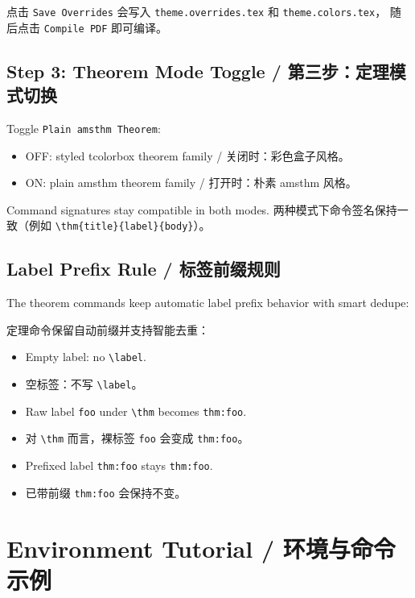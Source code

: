 \documentclass[oneside]{book}
\begin{document}
点击 \texttt{Save Overrides} 会写入
\texttt{theme.overrides.tex} 和 \texttt{theme.colors.tex}，
随后点击 \texttt{Compile PDF} 即可编译。

\section{Step 3: Theorem Mode Toggle / 第三步：定理模式切换}

Toggle \texttt{Plain amsthm Theorem}:
\begin{itemize}
    \item OFF: styled tcolorbox theorem family / 关闭时：彩色盒子风格。
    \item ON: plain amsthm theorem family / 打开时：朴素 amsthm 风格。
\end{itemize}

Command signatures stay compatible in both modes.
两种模式下命令签名保持一致（例如 \texttt{\textbackslash thm\{title\}\{label\}\{body\}}）。

\section{Label Prefix Rule / 标签前缀规则}

The theorem commands keep automatic label prefix behavior with smart dedupe:

定理命令保留自动前缀并支持智能去重：
\begin{itemize}
    \item Empty label: no \texttt{\textbackslash label}.
    \item 空标签：不写 \texttt{\textbackslash label}。
    \item Raw label \texttt{foo} under \texttt{\textbackslash thm} becomes \texttt{thm:foo}.
    \item 对 \texttt{\textbackslash thm} 而言，裸标签 \texttt{foo} 会变成 \texttt{thm:foo}。
    \item Prefixed label \texttt{thm:foo} stays \texttt{thm:foo}.
    \item 已带前缀 \texttt{thm:foo} 会保持不变。
\end{itemize}

\chapter{Environment Tutorial / 环境与命令示例}

\end{document}
